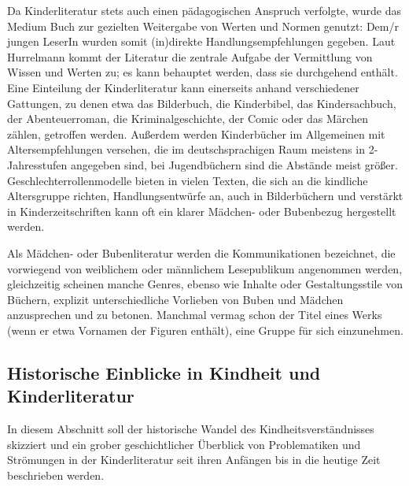     Da Kinderliteratur stets auch einen pädagogischen Anspruch verfolgte, wurde
    das Medium Buch zur gezielten Weitergabe von Werten und Normen genutzt:
    Dem/r jungen LeserIn wurden somit (in)direkte Handlungsempfehlungen gegeben.
    Laut Hurrelmann kommt der Literatur die zentrale Aufgabe der Vermittlung von
    Wissen und Werten zu; es kann behauptet werden, dass sie durchgehend
     enthält. Eine
    Einteilung der Kinderliteratur kann einerseits anhand  verschiedener
    Gattungen, zu denen etwa das Bilderbuch, die Kinderbibel, das
    Kindersachbuch, der Abenteuerroman, die Kriminalgeschichte, der Comic oder
    das Märchen zählen, getroffen werden. Außerdem werden Kinderbücher  im
    Allgemeinen mit Altersempfehlungen versehen, die im deutschsprachigen Raum
    meistens in 2- Jahresstufen angegeben sind, bei Jugendbüchern sind die
    Abstände meist größer. \parencite[10]{Ewers2011} Geschlechterrollenmodelle
    bieten in vielen Texten, die sich an die kindliche Altersgruppe richten,
    Handlungsentwürfe an, auch in Bilderbüchern und verstärkt in
    Kinderzeitschriften kann oft ein klarer Mädchen- oder Bubenbezug hergestellt
    werden.

    Als Mädchen- oder Bubenliteratur werden die Kommunikationen bezeichnet, die
    vorwiegend von  weiblichem oder männlichem Lesepublikum angenommen werden,
    gleichzeitig  scheinen manche Genres, ebenso wie Inhalte oder
    Gestaltungsstile von Büchern, explizit unterschiedliche Vorlieben von Buben
    und Mädchen anzusprechen und zu betonen. Manchmal vermag schon der Titel
    eines Werks (wenn er etwa Vornamen der Figuren enthält), eine Gruppe für
    sich einzunehmen.

  \subsection{Historische Einblicke in Kindheit und Kinderliteratur}

    In diesem Abschnitt soll der historische Wandel des Kindheitsverständnisses
    skizziert und ein grober geschichtlicher Überblick von Problematiken und
    Strömungen in der Kinderliteratur seit ihren Anfängen bis in die heutige
    Zeit beschrieben werden.


